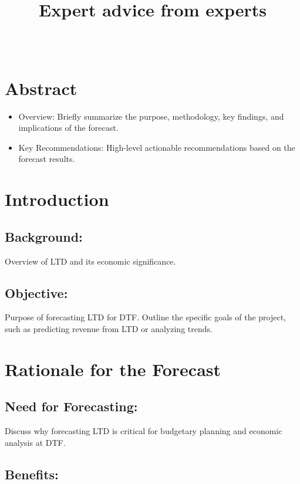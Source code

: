 \documentclass[11pt,a4paper,]{article}
\title{Expert advice from experts}
\author{\sf{\Large\textbf{Marie Curie}\\\large Nobel Prize, PhD\\[0.5cm]}}
\date{\sf\Date~\Month~\Year}
\makeatletter
\providecommand{\tightlist}{%
  \setlength{\itemsep}{0pt}\setlength{\parskip}{0pt}}
\def\titlepage{\front{\expandafter{\@title}}{\@author}{\@organization}}
\makeatother
\begin{document}
\titlepage

{
\setcounter{tocdepth}{2}
\tableofcontents
}
\section{Abstract}\label{abstract}

\begin{itemize}
\tightlist
\item
  Overview: Briefly summarize the purpose, methodology, key findings, and implications of the forecast.
\item
  Key Recommendations: High-level actionable recommendations based on the forecast results.
\end{itemize}

\section{Introduction}\label{introduction}

\subsection{Background:}\label{background}

Overview of LTD and its economic significance.

\subsection{Objective:}\label{objective}

Purpose of forecasting LTD for DTF. Outline the specific goals of the project, such as predicting revenue from LTD or analyzing trends.

\section{Rationale for the Forecast}\label{rationale-for-the-forecast}

\subsection{Need for Forecasting:}\label{need-for-forecasting}

Discuss why forecasting LTD is critical for budgetary planning and economic analysis at DTF.

\subsection{Benefits:}\label{benefits}
\end{document}
